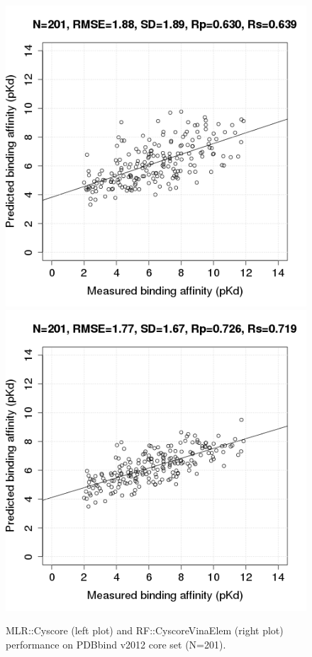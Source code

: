 \documentclass[journal=jacsat,manuscript=article]{achemso}
\begin{document}
\begin{figure}
\includegraphics[width=1.4\linewidth,natwidth=480,natheight=480]{../rfcyscore/x4/mlr/trn-247-tst-201-yp.png}
\endminipage\hfill
{}
\includegraphics[width=1.4\linewidth,natwidth=480,natheight=480]{../rfcyscore/x46/rf/trn-2280-tst-201-yp.png}
\endminipage\hfill
\caption{MLR::Cyscore (left plot) and RF::CyscoreVinaElem (right plot) performance on PDBbind v2012 core set (N=201).}
\label{fig:tst201}
\end{figure}
\end{document}
